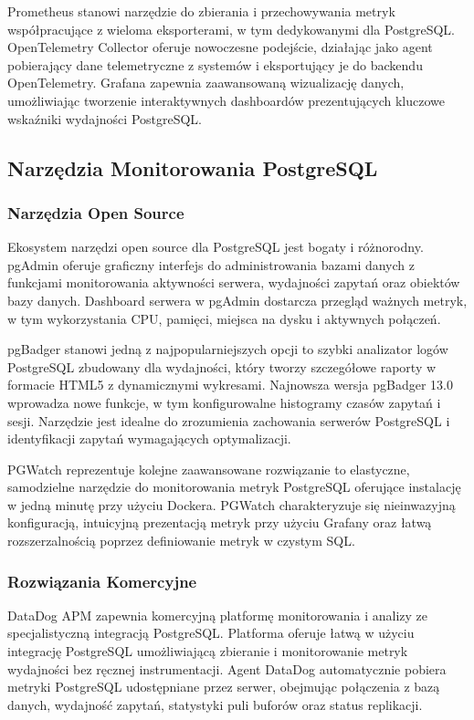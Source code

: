 \documentclass[a4paper,11pt,openany,english]{sphinxmanual}
\begin{document}
\sphinxAtStartPar
Prometheus stanowi narzędzie do zbierania i przechowywania metryk współpracujące z wieloma eksporterami, w tym dedykowanymi dla PostgreSQL. OpenTelemetry Collector oferuje nowoczesne podejście, działając jako agent pobierający dane telemetryczne z systemów i eksportujący je do backendu OpenTelemetry. Grafana zapewnia zaawansowaną wizualizację danych, umożliwiając tworzenie interaktywnych dashboardów prezentujących kluczowe wskaźniki wydajności PostgreSQL.


\subsection{Narzędzia Monitorowania PostgreSQL}
\label{\detokenize{rozdzial2/Monitorowanie-i-diagnostyka/index:narzedzia-monitorowania-postgresql}}

\subsubsection{Narzędzia Open Source}
\label{\detokenize{rozdzial2/Monitorowanie-i-diagnostyka/index:narzedzia-open-source}}
\sphinxAtStartPar
Ekosystem narzędzi open source dla PostgreSQL jest bogaty i różnorodny. pgAdmin oferuje graficzny interfejs do administrowania bazami danych z funkcjami monitorowania aktywności serwera, wydajności zapytań oraz obiektów bazy danych. Dashboard serwera w pgAdmin dostarcza przegląd ważnych metryk, w tym wykorzystania CPU, pamięci, miejsca na dysku i aktywnych połączeń.

\sphinxAtStartPar
pgBadger stanowi jedną z najpopularniejszych opcji \sphinxhyphen{} to szybki analizator logów PostgreSQL zbudowany dla wydajności, który tworzy szczegółowe raporty w formacie HTML5 z dynamicznymi wykresami. Najnowsza wersja pgBadger 13.0 wprowadza nowe funkcje, w tym konfigurowalne histogramy czasów zapytań i sesji. Narzędzie jest idealne do zrozumienia zachowania serwerów PostgreSQL i identyfikacji zapytań wymagających optymalizacji.

\sphinxAtStartPar
PGWatch reprezentuje kolejne zaawansowane rozwiązanie \sphinxhyphen{} to elastyczne, samodzielne narzędzie do monitorowania metryk PostgreSQL oferujące instalację w jedną minutę przy użyciu Dockera. PGWatch charakteryzuje się nieinwazyjną konfiguracją, intuicyjną prezentacją metryk przy użyciu Grafany oraz łatwą rozszerzalnością poprzez definiowanie metryk w czystym SQL.


\subsubsection{Rozwiązania Komercyjne}
\label{\detokenize{rozdzial2/Monitorowanie-i-diagnostyka/index:rozwiazania-komercyjne}}
\sphinxAtStartPar
DataDog APM zapewnia komercyjną platformę monitorowania i analizy ze specjalistyczną integracją PostgreSQL. Platforma oferuje łatwą w użyciu integrację PostgreSQL umożliwiającą zbieranie i monitorowanie metryk wydajności bez ręcznej instrumentacji. Agent DataDog automatycznie pobiera metryki PostgreSQL udostępniane przez serwer, obejmując połączenia z bazą danych, wydajność zapytań, statystyki puli buforów oraz status replikacji.
\end{document}
